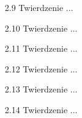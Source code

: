 \begin{enumerate}
    \item [2.9] Twierdzenie ...
    \item [2.10] Twierdzenie ...
    \item [2.11] Twierdzenie ...
    \item [2.12] Twierdzenie ...
    \item [2.13] Twierdzenie ...
    \item [2.14] Twierdzenie ...
\end{enumerate}	